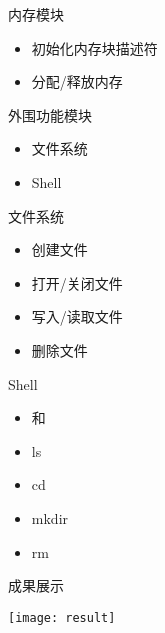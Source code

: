 \documentclass{swfubeamer}
\newcommand\Ctrl[1]{\LKeyCtrlX{#1}} %
\begin{document}
\begin{frame}{内存模块}
  \begin{itemize}
  \item 初始化内存块描述符
  \item 分配/释放内存
  \end{itemize}
\end{frame}

\begin{frame}{外围功能模块}
  \begin{itemize}
  \item 文件系统
  \item Shell
  \end{itemize}
\end{frame}

\begin{frame}{文件系统}
  \begin{itemize}
  \item 创建文件
  \item 打开/关闭文件
  \item 写入/读取文件
  \item 删除文件
  \end{itemize}
\end{frame}

\begin{frame}{Shell}
  \begin{itemize}
  \item \Ctrl{L} 和 \Ctrl{U}
  \item ls
  \item cd
  \item mkdir
  \item rm
  \end{itemize}
\end{frame}

\begin{frame}{成果展示}
  \begin{center}
    \texttt{[image: result]}
  \end{center}
\end{frame}
\end{document}
